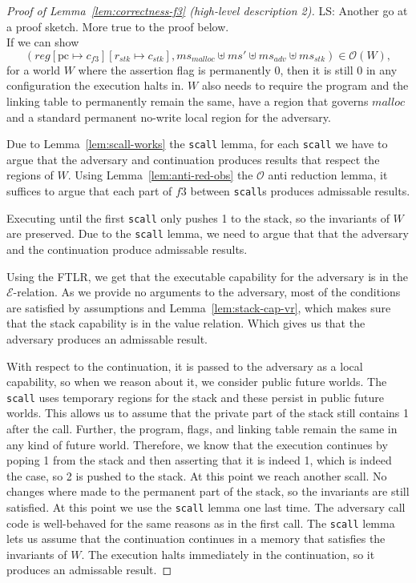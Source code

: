 \documentclass[a4paper]{article}
\newcommand{\update}[2]{[#1 \mapsto #2]}
\newcommand\lau[1]{{\color{purple} \sf \footnotesize {LS: #1}}\\}
\newcommand{\var}[1]{\mathit{#1}}
\newcommand{\hs}{\var{ms}}
\newcommand{\ms}{\hs}
\newcommand{\pcreg}{\mathrm{pc}}
\newcommand{\reg}{\var{reg}}
\newcommand{\adv}{\var{adv}}
\newcommand{\stk}{\var{stk}}
\newcommand{\codelabel}[1]{\mathit{#1}}
\newcommand{\malloc}{\codelabel{malloc}}
\newcommand{\asmType}{\plaindom{AsmType}}
\newcommand{\plaindom}[1]{\mathrm{#1}}
\newcommand{\intr}[2]{\mathcal{#1}}
\newcommand{\exprintr}[1]{\intr{E}{#1}}
\newcommand{\stder}{\exprintr{\asmType}}
\newcommand{\observations}{\mathcal{O}}
\begin{document}
\begin{proof}[Proof of Lemma~\ref{lem:correctness-f3} (high-level description 2)]
\lau{Another go at a proof sketch. More true to the proof below.}
If we can show
\begin{equation}
  (\reg\update{\pcreg}{c_{f3}}\update{r_\stk}{c_\stk},\ms_{\malloc} \uplus \ms' \uplus \ms_{\adv} \uplus \ms_\stk) \in \observations(W),
\end{equation}
for a world $W$ where the assertion flag is permanently 0, then it is still 0 in any configuration the execution halts in. $W$ also needs to require the program and the linking table to permanently remain the same, have a region that governs $\malloc$ and a standard permanent no-write local region for the adversary.

Due to Lemma~\ref{lem:scall-works} the \texttt{scall} lemma, for each \texttt{scall} we have to argue that the adversary and continuation produces results that respect the regions of $W$. Using Lemma~\ref{lem:anti-red-obs} the $\observations$ anti reduction lemma, it suffices to argue that each part of $f3$ between \texttt{scall}s produces admissable results.

Executing until the first \texttt{scall} only pushes 1 to the stack, so the invariants of $W$ are preserved. Due to the \texttt{scall} lemma, we need to argue that that the adversary and the continuation produce admissable results.

Using the FTLR, we get that the executable capability for the adversary is in the $\stder$-relation. As we provide no arguments to the adversary, most of the conditions are satisfied by assumptions and Lemma~\ref{lem:stack-cap-vr}, which makes sure that the stack capability is in the value relation. Which gives us that the adversary produces an admissable result.

With respect to the continuation, it is passed to the adversary as a local capability, so when we reason about it, we consider public future worlds. The \texttt{scall} uses temporary regions for the stack and these persist in public future worlds. This allows us to assume that the private part of the stack still contains 1 after the call. Further, the program, flags, and linking table remain the same in any kind of future world. Therefore, we know that the execution continues by poping 1 from the stack and then asserting that it is indeed 1, which is indeed the case, so 2 is pushed to the stack. At this point we reach another scall. No changes where made to the permanent part of the stack, so the invariants are still satisfied. At this point we use the \texttt{scall} lemma one last time. The adversary call code is well-behaved for the same reasons as in the first call. The \texttt{scall} lemma lets us assume that the continuation continues in a memory that satisfies the invariants of $W$. The execution halts immediately in the continuation, so it produces an admissable result.
\end{proof}
\end{document}
